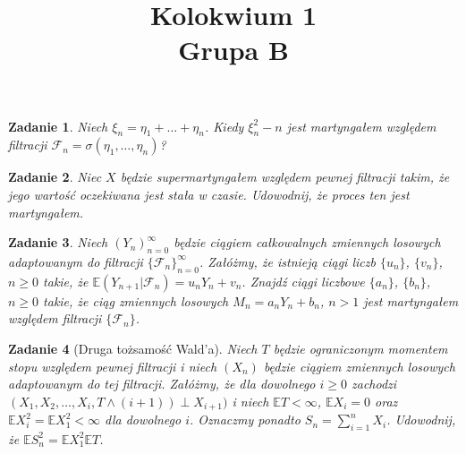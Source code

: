 \documentclass{mwart}
\title{Kolokwium 1\\Grupa B}
\newtheorem{zd}{Zadanie}
\begin{document}

\maketitle

\begin{zd}
Niech $\xi_n = \eta_1 + \dots + \eta_n$. Kiedy $\xi_n^2-n$ jest martyngałem względem filtracji $\mathcal{F}_n = \sigma (\eta_1, \dots, \eta_n)$?
\end{zd}

\begin{zd}
Niec $X$ będzie supermartyngałem względem pewnej filtracji takim, że jego wartość oczekiwana jest stała w czasie. Udowodnij, że proces ten jest martyngałem.
\end{zd}

\begin{zd}
Niech $(Y_n)_{n=0}^{\infty}$ będzie ciągiem całkowalnych zmiennych losowych adaptowanym do filtracji $\{\mathcal{F}_n\}_{n=0}^{\infty}$. Załóżmy, że istnieją ciągi liczb $\{u_n\}$, $\{v_n\}$, $n\geq 0$ takie, że $\mathbb{E}(Y_{n+1}|\mathcal{F}_n) = u_nY_n + v_n$. Znajdź ciągi liczbowe $\{a_n\}$, $\{b_n\}$, $n\geq 0$ takie, że ciąg zmiennych losowych $M_n = a_nY_n + b_n$, $n> 1$ jest martyngałem względem filtracji  $\{\mathcal{F}_n\}$.
\end{zd}

\begin{zd}[Druga tożsamość Wald'a]
Niech $T$ będzie ograniczonym momentem stopu względem pewnej filtracji i niech $(X_n)$ będzie ciągiem zmiennych losowych adaptowanym do tej filtracji. Załóżmy, że dla dowolnego $i\geq 0$ zachodzi $(X_1, X_2, \dots, X_i, T\wedge (i+1)) \perp X_{i+1})$ i niech $\mathbb{E}T < \infty$, $\mathbb{E}X_i = 0$ oraz $\mathbb{E}X_i^2 = \mathbb{E}X_1^2 < \infty$ dla dowolnego $i$. Oznaczmy ponadto $S_n = \sum_{i=1}^nX_i$. Udowodnij, że $\mathbb{E}S_n^2 = \mathbb{E}X_1^2\mathbb{E}T$.
\end{zd}
\end{document}

